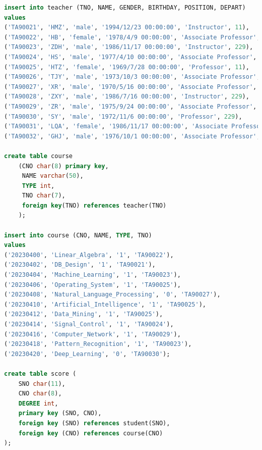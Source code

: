 \documentclass{ctexart}
\begin{document}
\begin{lstlisting}[language=sql]
insert into teacher (TNO, NAME, GENDER, BIRTHDAY, POSITION, DEPART)  
values
('TA90021', 'HMZ', 'male', '1994/12/23 00:00:00', 'Instructor', 11),
('TA90022', 'HB', 'female', '1978/4/9 00:00:00', 'Associate Professor', 10),
('TA90023', 'ZDH', 'male', '1986/11/17 00:00:00', 'Instructor', 229),
('TA90024', 'HS', 'male', '1977/4/10 00:00:00', 'Associate Professor', 6),
('TA90025', 'HTZ', 'female', '1969/7/28 00:00:00', 'Professor', 11),
('TA90026', 'TJY', 'male', '1973/10/3 00:00:00', 'Associate Professor', 12),
('TA90027', 'XR', 'male', '1970/5/16 00:00:00', 'Associate Professor', 11),
('TA90028', 'ZXY', 'male', '1986/7/16 00:00:00', 'Instructor', 229),
('TA90029', 'ZR', 'male', '1975/9/24 00:00:00', 'Associate Professor', 11),
('TA90030', 'SY', 'male', '1972/11/6 00:00:00', 'Professor', 229),
('TA90031', 'LQA', 'female', '1986/11/17 00:00:00', 'Associate Professor', 10),
('TA90032', 'GHJ', 'male', '1976/10/1 00:00:00', 'Associate Professor', 18);

create table course  
	(CNO char(8) primary key,   
	 NAME varchar(50),   
     TYPE int,   
	 TNO char(7),  
     foreign key(TNO) references teacher(TNO)  
    );  
    
insert into course (CNO, NAME, TYPE, TNO)
values
('20230400', 'Linear_Algebra', '1', 'TA90022'),
('20230402', 'DB_Design', '1', 'TA90021'),
('20230404', 'Machine_Learning', '1', 'TA90023'),
('20230406', 'Operating_System', '1', 'TA90025'),
('20230408', 'Natural_Language_Processing', '0', 'TA90027'),
('20230410', 'Artificial_Intelligence', '1', 'TA90025'),
('20230412', 'Data_Mining', '1', 'TA90025'),
('20230414', 'Signal_Control', '1', 'TA90024'),
('20230416', 'Computer_Network', '1', 'TA90029'),
('20230418', 'Pattern_Recognition', '1', 'TA90023'),
('20230420', 'Deep_Learning', '0', 'TA90030');

create table score (  
    SNO char(11),  
    CNO char(8),  
    DEGREE int,  
    primary key (SNO, CNO),  
    foreign key (SNO) references student(SNO),  
    foreign key (CNO) references course(CNO)  
);



\end{lstlisting}
\end{document}
